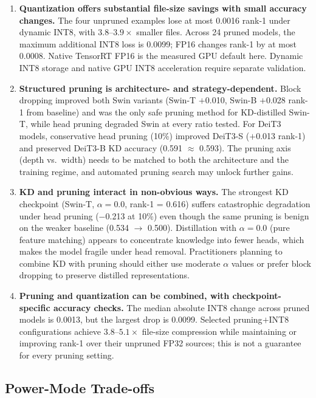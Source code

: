\documentclass[runningheads,a4paper]{llncs}
\begin{document}
\begin{enumerate}
    \item \textbf{Quantization offers substantial file-size savings with small accuracy changes.} The four unpruned examples lose at most 0.0016 rank-1 under dynamic INT8, with $3.8$--$3.9\times$ smaller files. Across 24 pruned models, the maximum additional INT8 loss is 0.0099; FP16 changes rank-1 by at most 0.0008. Native TensorRT FP16 is the measured GPU default here. Dynamic INT8 storage and native GPU INT8 acceleration require separate validation.

    \item \textbf{Structured pruning is architecture- and strategy-dependent.} Block dropping improved both Swin variants (Swin-T $+$0.010, Swin-B $+$0.028 rank-1 from baseline) and was the only safe pruning method for KD-distilled Swin-T, while head pruning degraded Swin at every ratio tested. For DeiT3 models, conservative head pruning (10\%) improved DeiT3-S ($+$0.013 rank-1) and preserved DeiT3-B KD accuracy (0.591 $\approx$ 0.593). The pruning axis (depth vs.\ width) needs to be matched to both the architecture and the training regime, and automated pruning search may unlock further gains.

    \item \textbf{KD and pruning interact in non-obvious ways.} The strongest KD checkpoint (Swin-T, $\alpha{=}0.0$, rank-1 = 0.616) suffers catastrophic degradation under head pruning ($-$0.213 at 10\%) even though the same pruning is benign on the weaker baseline (0.534 $\to$ 0.500). Distillation with $\alpha{=}0.0$ (pure feature matching) appears to concentrate knowledge into fewer heads, which makes the model fragile under head removal. Practitioners planning to combine KD with pruning should either use moderate $\alpha$ values or prefer block dropping to preserve distilled representations.

    \item \textbf{Pruning and quantization can be combined, with checkpoint-specific accuracy checks.} The median absolute INT8 change across pruned models is 0.0013, but the largest drop is 0.0099. Selected pruning$+$INT8 configurations achieve $3.8$--$5.1\times$ file-size compression while maintaining or improving rank-1 over their unpruned FP32 sources; this is not a guarantee for every pruning setting.
\end{enumerate}

\subsection{Power-Mode Trade-offs}\label{sec:power-modes}
\end{document}
